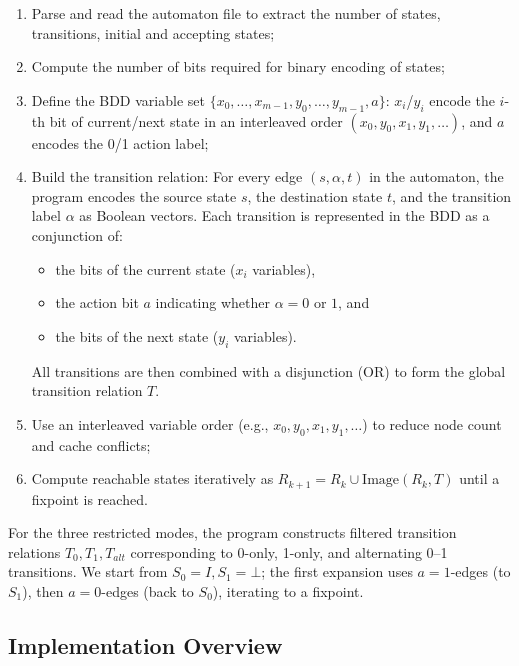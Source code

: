 \documentclass[a4paper,11pt]{article}
\begin{document}
\begin{enumerate}
  \item Parse and read the automaton file to extract the number of states, transitions, initial and accepting states;
  \item Compute the number of bits required for binary encoding of states;
    \item Define the BDD variable set $\{x_0,\dots,x_{m-1},y_0,\dots,y_{m-1},a\}$:
          $x_i$/$y_i$ encode the $i$-th bit of current/next state in an interleaved order
          $(x_0,y_0,x_1,y_1,\dots)$, and $a$ encodes the 0/1 action label;
    \item Build the transition relation:
      For every edge $(s, \alpha, t)$ in the automaton, 
      the program encodes the source state $s$, the destination state $t$, 
      and the transition label $\alpha$ as Boolean vectors.
      Each transition is represented in the BDD as a conjunction of:
      \begin{itemize}
        \item the bits of the current state ($x_i$ variables),
        \item the action bit $a$ indicating whether $\alpha = 0$ or $1$, and
        \item the bits of the next state ($y_i$ variables).
      \end{itemize}
      All transitions are then combined with a disjunction (OR) to form
      the global transition relation $T$.
    \item Use an interleaved variable order (e.g., $x_0,y_0,x_1,y_1,\dots$) to reduce node count and cache conflicts;
    \item Compute reachable states iteratively as
          $R_{k+1}=R_k\cup\mathrm{Image}(R_k,T)$ until a fixpoint is reached.
    
\end{enumerate}

For the three restricted modes, the program constructs filtered transition relations
\(T_0, T_1, T_{alt}\)
corresponding to 0-only, 1-only, and alternating 0–1 transitions.
We start from $S_0 = I, S_1 = \bot$; the first expansion uses $a = 1$-edges (to $S_1$),
then $a = 0$-edges (back to $S_0$), iterating to a fixpoint.




\subsection*{Implementation Overview}
\end{document}
